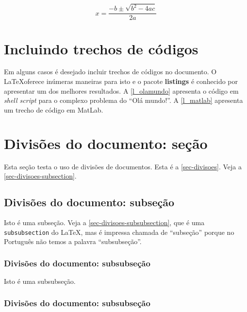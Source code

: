 \begin{equation}
 x=\frac{-b\pm\sqrt{b^2-4ac}}{2a}
\label{e_c2_eq1}
\end{equation}

\section{Incluindo trechos de códigos}

Em alguns casos é desejado incluir trechos de códigos no documento. O \LaTeX oferece inúmeras maneiras para isto e o pacote \textbf{listings} é conhecido por apresentar um dos melhores resultados. A \autoref{l_olamundo} apresenta o código em \textit{shell script} para o complexo problema do ``Olá mundo!''. A \autoref{l_matlab} apresenta um trecho de código em MatLab.




\section{Divisões do documento: seção}\label{sec-divisoes}

Esta seção testa o uso de divisões de documentos. Esta é a
\autoref{sec-divisoes}. Veja a \autoref{sec-divisoes-subsection}.

\subsection{Divisões do documento: subseção}\label{sec-divisoes-subsection}

Isto é uma subseção. Veja a \autoref{sec-divisoes-subsubsection}, que é uma
\texttt{subsubsection} do \LaTeX, mas é impressa chamada de ``subseção'' porque
no Português não temos a palavra ``subsubseção''.

\subsubsection{Divisões do documento: subsubseção}
\label{sec-divisoes-subsubsection}

Isto é uma subsubseção.

\subsubsection{Divisões do documento: subsubseção}

